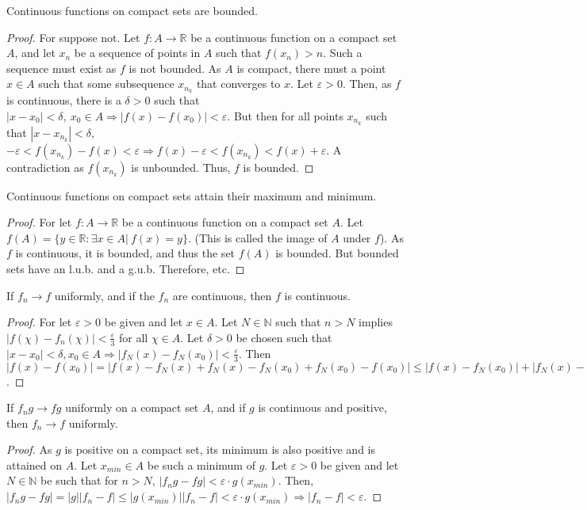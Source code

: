\documentclass[crop=false,class=book]{standalone}
\begin{document}
\begin{theorem}
Continuous functions on compact sets are bounded.
\end{theorem}
\begin{proof}
For suppose not. Let $f:A\rightarrow \mathbb{R}$ be a continuous function on a compact set $A$, and let $x_n$ be a sequence of points in $A$ such that $f(x_n)>n$. Such a sequence must exist as $f$ is not bounded. As $A$ is compact, there must a point $x\in A$ such that some subsequence $x_{n_k}$ that converges to $x$. Let $\varepsilon >0$. Then, as $f$ is continuous, there is a $\delta>0$ such that $|x-x_0|<\delta,\ x_0\in A\Rightarrow |f(x)-f(x_0)|<\varepsilon$. But then for all points $x_{n_k}$ such that $|x-x_{n_k}|<\delta$, $-\varepsilon<f(x_{n_k})-f(x)<\varepsilon \Rightarrow f(x)-\varepsilon < f(x_{n_k})<f(x)+\varepsilon$. A contradiction as $f(x_{n_k})$ is unbounded. Thus, $f$ is bounded.
\end{proof}
\begin{corollary}
Continuous functions on compact sets attain their maximum and minimum.
\end{corollary}
\begin{proof}
For let $f:A\rightarrow \mathbb{R}$ be a continuous function on a compact set $A$. Let $f(A) = \{y\in \mathbb{R}:\exists x\in A|\ f(x)=y\}$. (This is called the image of $A$ under $f$). As $f$ is continuous, it is bounded, and thus the set $f(A)$ is bounded. But bounded sets have an l.u.b. and a g.u.b. Therefore, etc.
\end{proof}
\begin{lemma}
If $f_n\rightarrow f$ uniformly, and if the $f_n$ are continuous, then $f$ is continuous.
\end{lemma}
\begin{proof}
For let $\varepsilon>0$ be given and let $x\in A$. Let $N\in \mathbb{N}$ such that $n>N$ implies $|f(\chi)-f_n(\chi)|<\frac{\varepsilon}{3}$ for all $\chi\in A$. Let $\delta>0$ be chosen such that $|x-x_0|<\delta, x_0\in A\Rightarrow |f_N(x)-f_N(x_0)|<\frac{\varepsilon}{3}$. Then  $|f(x)-f(x_0)|=|f(x)-f_N(x)+f_N(x)-f_N(x_0)+f_N(x_0)-f(x_0)|\leq |f(x)-f_N(x_0)|+|f_N(x)-f_N(x_0)|+|f(x_0)-f_N(x_0)|<\varepsilon$.
\end{proof}
\begin{theorem}
If $f_ng\rightarrow fg$ uniformly on a compact set $A$, and if $g$ is continuous and positive, then $f_n\rightarrow f$ uniformly.
\end{theorem}
\begin{proof}
As $g$ is positive on a compact set, its minimum is also positive and is attained on $A$. Let $x_{min}\in A$ be such a minimum of $g$. Let $\varepsilon>0$ be given and let $N\in \mathbb{N}$ be such that for $n>N$, $|f_ng-fg|<\varepsilon\cdot g(x_{min})$. Then, $|f_ng-fg|=|g||f_n-f|\leq |g(x_{min})||f_n-f|<\varepsilon \cdot g(x_{min})\Rightarrow |f_n-f|<\varepsilon$.
\end{proof}
\end{document}
